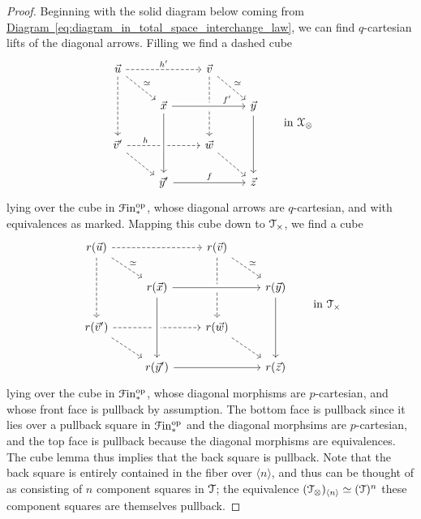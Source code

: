 \documentclass[main.tex]{subfiles}
\begin{document}
\begin{proof}
  Beginning with the solid diagram below coming from \hyperref[eq:diagram_in_total_space_interchange_law]{Diagram~\ref*{eq:diagram_in_total_space_interchange_law}}, we can find $q$-cartesian lifts of the diagonal arrows. Filling we find a dashed cube
  \begin{equation*}
    \begin{tikzcd}
      \vec{u}
      \arrow[rr, dashed, "h'"]
      \arrow[dd, dashed]
      \arrow[dr, dashed, "\simeq"]
      && \vec{v}
      \arrow[dd, dashed]
      \arrow[dr, dashed, "\simeq"]
      \\
      & \vec{x}
      \arrow[rr, crossing over, near end, "f'"]
      && \vec{y}
      \arrow[dd]
      \\
      \vec{v}'
      \arrow[rr, dashed, "h", near start]
      \arrow[dr, dashed]
      && \vec{w}
      \arrow[dr, dashed]
      \\
      & \vec{y}'
      \arrow[uu, near start, crossing over, leftarrow]
      \arrow[rr, "f"]
      && \vec{z}
    \end{tikzcd}
    \qquad \text{in }\category{X}_{\otimes}
  \end{equation*}
  lying over the cube in $\mathcal{F}\mathrm{in}_{*}^{\mathrm{op}}$, whose diagonal arrows are $q$-cartesian, and with equivalences as marked. Mapping this cube down to $\mathcal{T}_{\times}$, we find a cube
  \begin{equation*}
    \begin{tikzcd}
      r(\vec{u})
      \arrow[rr, dashed]
      \arrow[dd, dashed]
      \arrow[dr, dashed, "\simeq"]
      && r(\vec{v})
      \arrow[dd, dashed]
      \arrow[dr, dashed, "\simeq"]
      \\
      & r(\vec{x})
      \arrow[rr, crossing over, near end]
      && r(\vec{y})
      \arrow[dd]
      \\
      r(\vec{v}')
      \arrow[rr, dashed]
      \arrow[dr, dashed]
      && r(\vec{w})
      \arrow[dr, dashed]
      \\
      & r(\vec{y}')
      \arrow[uu, near start, crossing over, leftarrow]
      \arrow[rr]
      && r(\vec{z})
    \end{tikzcd}
    \qquad \text{in }\category{T}_{\times}
  \end{equation*}
  lying over the cube in $\mathcal{F}\mathrm{in}_{*}^{\mathrm{op}}$, whose diagonal morphisms are $p$-cartesian, and whose front face is pullback by assumption. The bottom face is pullback since it lies over a pullback square in $\mathcal{F}\mathrm{in}_{*}^{\mathrm{op}}$ and the diagonal morphsims are $p$-cartesian, and the top face is pullback because the diagonal morphisms are equivalences. The cube lemma thus implies that the back square is pullback. Note that the back square is entirely contained in the fiber over $\langle n \rangle$, and thus can be thought of as consisting of $n$ component squares in $\mathcal{T}$; the equivalence $(\mathcal{T}_{\otimes})_{\langle n \rangle} \simeq (\mathcal{T})^{n}$ these component squares are themselves pullback.


\end{proof}
\end{document}
